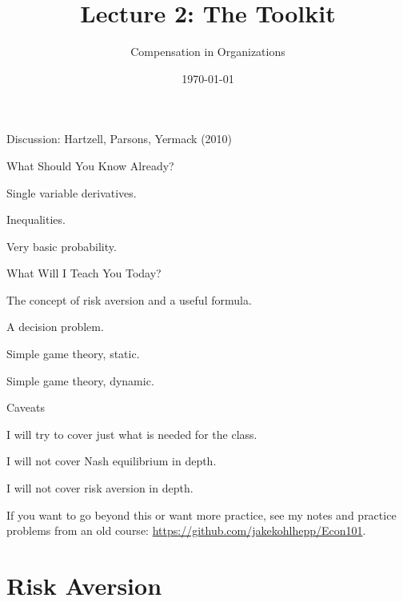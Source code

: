 \documentclass[aspectratio=169,usenames,dvipsnames]{beamer}
\title[diss]{Lecture 2: The Toolkit} %
\author{Compensation in Organizations} %
\institute[shortinst]{Jacob Kohlhepp}
\date{\today} %
\newenvironment{wideitemize}{\itemize\addtolength{\itemsep}{10pt}}{\enditemize}
\begin{document}
\begin{frame}
\titlepage %

\end{frame}

\begin{frame}
\centering
    \huge Discussion: Hartzell, Parsons, Yermack (2010)
\end{frame}


\begin{frame}{What Should You Know Already?}

\begin{wideitemize}
    \item Single variable derivatives.
    \item Inequalities.
    \item Very basic probability.
\end{wideitemize}
\end{frame}

\begin{frame}{What Will I Teach You Today?}

\begin{wideitemize}
    \item The concept of risk aversion and a useful formula.
    \item A decision problem.
    \item Simple game theory, static.
    \item Simple game theory, dynamic.
\end{wideitemize}
\end{frame}


\begin{frame}{Caveats}

\begin{wideitemize}
    \item I will try to cover just what is needed for the class.
    \item I will not cover Nash equilibrium in depth.
    \item I will not cover risk aversion in depth.
    \item If you want to go beyond this or want more practice, see my notes and practice problems from an old course: \url{https://github.com/jakekohlhepp/Econ101}.
\end{wideitemize}
\end{frame}

\section{Risk Aversion}
\end{document}
